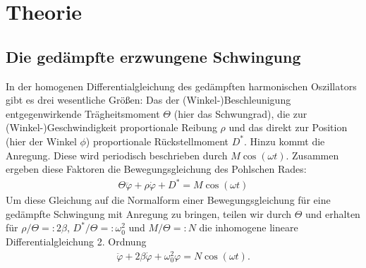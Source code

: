 \section{Theorie}
\subsection{Die gedämpfte erzwungene Schwingung}
In der homogenen Differentialgleichung des gedämpften harmonischen Oszillators gibt es drei wesentliche Größen: Das der
(Winkel-)Beschleunigung entgegenwirkende Trägheitsmoment $\Theta$ (hier das Schwungrad), die zur (Winkel-)Geschwindigkeit proportionale Reibung
$\rho$ und das direkt zur Position (hier der Winkel $\phi$) proportionale Rückstellmoment $D^*$.
Hinzu kommt die Anregung. Diese wird periodisch beschrieben durch $M\cos(\omega t).$ 
Zusammen ergeben diese Faktoren die Bewegungsgleichung des Pohlschen Rades:
\begin{align}
\label{eq:1}
\Theta\ddot{\varphi}+\rho\dot{\varphi}+D^*=M\cos(\omega t)
\end{align}
Um diese Gleichung auf die Normalform einer Bewegungsgleichung für eine gedämpfte Schwingung mit Anregung zu bringen, teilen
wir durch $\Theta$ und erhalten für $\rho/\Theta=:2\beta$, $D^*/\Theta=:\omega_0^2$ und $M/\Theta=:N$
die inhomogene lineare Differentialgleichung 2. Ordnung
\begin{align}
\label{eq:2}
\ddot{\varphi}+2\beta\dot{\varphi}+\omega_0^2\varphi=N\cos(\omega t).
\end{align}


